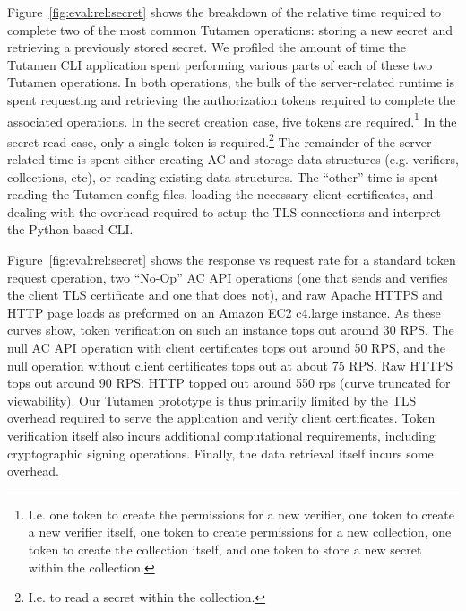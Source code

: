 Figure~\ref{fig:eval:rel:secret} shows the breakdown of the relative
time required to complete two of the most common Tutamen operations:
storing a new secret and retrieving a previously stored secret. We
profiled the amount of time the Tutamen CLI application spent
performing various parts of each of these two Tutamen operations. In
both operations, the bulk of the server-related runtime is spent
requesting and retrieving the authorization tokens required to
complete the associated operations. In the secret creation case, five
tokens are required.\footnote{I.e. one token to create the permissions
  for a new verifier, one token to create a new verifier itself, one
  token to create permissions for a new collection, one token to
  create the collection itself, and one token to store a new secret
  within the collection.} In the secret read case, only a single token
is required.\footnote{I.e. to read a secret within the collection.}
The remainder of the server-related time is spent either creating AC
and storage data structures (e.g. verifiers, collections, etc), or
reading existing data structures. The ``other'' time is spent reading
the Tutamen config files, loading the necessary client certificates,
and dealing with the overhead required to setup the TLS connections
and interpret the Python-based CLI.
 
Figure~\ref{fig:eval:rel:secret} shows the response vs request rate
for a standard token request operation, two ``No-Op'' AC API
operations (one that sends and verifies the client TLS certificate and
one that does not), and raw Apache HTTPS and HTTP page loads as
preformed on an Amazon EC2 c4.large instance. As these curves show,
token verification on such an instance tops out around 30 RPS. The
null AC API operation with client certificates tops out around 50 RPS,
and the null operation without client certificates tops out at about
75 RPS. Raw HTTPS tops out around 90 RPS. HTTP topped out around 550
rps (curve truncated for viewability). Our Tutamen prototype is thus
primarily limited by the TLS overhead required to serve the
application and verify client certificates. Token verification itself
also incurs additional computational requirements, including
cryptographic signing operations. Finally, the data retrieval itself
incurs some overhead.

